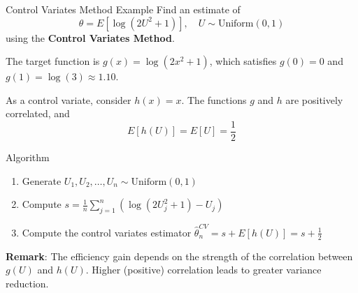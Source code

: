 \documentclass[8pt]{beamer}
\begin{document}
\begin{frame}{Control Variates Method Example}
Find an estimate of 
\begin{equation*}
	\theta = E\!\left[\log(2U^2 + 1)\right], \quad U \sim \text{Uniform}(0,1)
\end{equation*}
using the \textbf{Control Variates Method}.

The target function is $g(x) = \log(2x^2 + 1)$, which satisfies $g(0) = 0$ and $g(1) = \log(3) \approx 1.10$.

As a control variate, consider $h(x) = x$. The functions $g$ and $h$ are positively correlated, and
\begin{equation*}
E[h(U)] = E[U] = \frac{1}{2}
\end{equation*}

\alert{Algorithm}
\begin{enumerate}
  \item Generate $U_1, U_2, \ldots, U_n \sim \text{Uniform}(0,1)$
  \item Compute $s = \frac{1}{n} \sum_{j=1}^n \left(\log(2U_j^2 + 1) - U_j \right)$
  \item Compute the control variates estimator $\hat{\theta}_n^{CV} = s + E[h(U)] = s + \frac{1}{2}$
\end{enumerate}

\textbf{Remark}: The efficiency gain depends on the strength of the correlation between $g(U)$ and $h(U)$. Higher (positive) correlation leads to greater variance reduction.
\end{frame}



%
%
\end{document}
